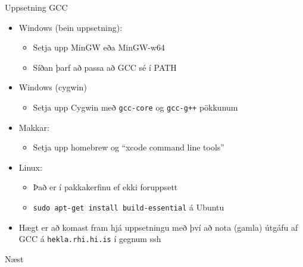 \documentclass[handout]{beamer}
\begin{document}
\begin{frame}{Uppsetning GCC}
\begin{itemize}
 \item Windows (bein uppsetning):
 \begin{itemize}
  \item Setja upp MinGW eða MinGW-w64
  \item Síðan þarf að passa að GCC sé í PATH
 \end{itemize}
 \item Windows (cygwin)
 \begin{itemize}
  \item Setja upp Cygwin með \texttt{gcc-core} og \texttt{gcc-g++} pökkunum
 \end{itemize}
 \item Makkar: 
 \begin{itemize}
  \item Setja upp homebrew og ``xcode command line tools''
 \end{itemize}
 \item Linux:
 \begin{itemize}
  \item Það er í pakkakerfinu ef ekki foruppsett
  \item \texttt{sudo apt-get install build-essential} á Ubuntu
 \end{itemize}
 \item Hægt er að komast fram hjá uppsetningu með því að nota (gamla) útgáfu af GCC á \texttt{hekla.rhi.hi.is} í gegnum ssh
\end{itemize}
\end{frame}



\begin{frame}{Næst}
\end{frame}
\end{document}
